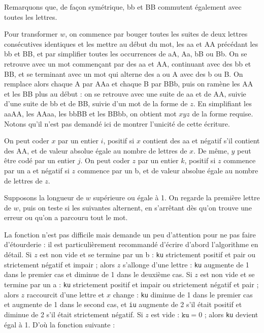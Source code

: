 Remarquons que, de façon symétrique, bb et BB commutent également avec toutes les lettres.

\Q
Pour transformer $w$, on commence par bouger toutes les suites de deux lettres consécutives identiques et les mettre au début du mot, les aa et AA précédant les bb et BB, et par simplifier toutes les occurrences de aA, Aa, bB ou Bb. On se retrouve avec un mot commençant par des aa et AA, continuant avec des bb et BB, et se terminant avec un mot qui alterne des a ou A avec des b ou B. On remplace alors chaque A par AAa et chaque B par BBb, puis on ramène les AA et les BB plus au début : on se retrouve avec une suite de aa et de AA, suivie d'une suite de bb et de BB, suivie d'un mot de la forme de $z$. En simplifiant les aaAA, les AAaa, les bbBB et les BBbb, on obtient mot $xyz$ de la forme requise. Notons qu'il n'est pas demandé ici de montrer l'unicité de cette écriture.

\Q
On peut coder $x$ par un entier $i$, positif si $x$ contient des aa et négatif s'il contient des AA, et de valeur absolue égale au nombre de lettres de $x$. De même, $y$ peut être codé par un entier $j$. On peut coder $z$ par un entier $k$, positif si $z$ commence par un a et négatif si $z$ commence par un b, et de valeur absolue égale au nombre de lettres de $z$.

\Q
Supposons la longueur de $w$ supérieure ou égale à 1. On regarde la première lettre de $w$, puis on teste si les suivantes alternent, en s'arrêtant dès qu'on trouve une erreur ou qu'on a parcouru tout le mot.


\newpage

\Q
La fonction n'est pas difficile mais demande un peu d'attention pour ne pas faire d'étourderie : il est particulièrement recommandé d'écrire d'abord l'algorithme en détail. Si $z$ est non vide et se termine par un b : \texttt{ku} strictement positif et pair ou strictement négatif et impair ; alors $z$ s'allonge d'une lettre : \texttt{ku} augmente de 1 dans le premier cas et diminue de 1 dans le deuxième cas. Si $z$ est non vide et se termine par un a : \texttt{ku} strictement positif et impair ou strictement négatif et pair ; alors $z$ raccourcit d'une lettre et $x$ change : \texttt{ku} diminue de 1 dans le premier cas et augmente de 1 dans le second cas, et \texttt{iu} augmente de 2 s'il était positif et diminue de 2 s'il était strictement négatif. Si $z$ est vide : $\texttt{ku}=0$ ; alors \texttt{ku} devient égal à 1. D'où la fonction suivante :

